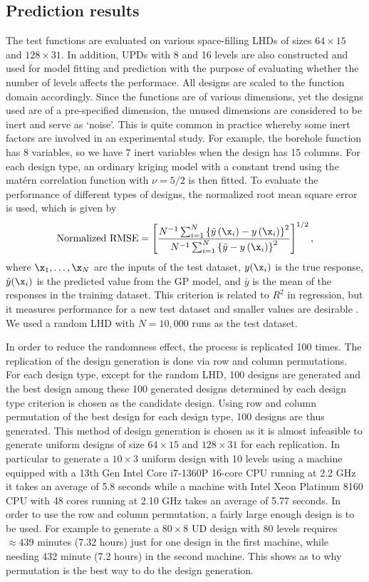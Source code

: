 \documentclass [PhD] {package/uclathes}
\begin{document}
\clearpage
\subsection{Prediction results}

The test functions are evaluated on various space-filling LHDs of sizes $64\times 15$ and $128\times 31$. In addition, UPDs with 8 and 16 levels are also constructed and used for model fitting and prediction with the purpose of evaluating whether the number of levels affects the performace. All designs are scaled to the function domain accordingly.
 Since the functions are of various dimensions, yet the designs used are of a pre-specified dimension, the unused dimensions are considered to be inert and serve as `noise'. This is quite common in practice whereby some inert factors are involved in an experimental study. For example, the borehole function has 8 variables, so we have 7 inert variables when the design has 15 columns. For each design type, an ordinary kriging model with a constant trend using the mat\'ern correlation function with $\nu = 5/2$ is then fitted. To evaluate the performance of different types of designs, the normalized root mean square error is used, which is given by
$$
\text {Normalized RMSE}=\left[\frac{N^{-1} \sum_{i=1}^N\left\{\hat{y}\left(\x_i\right)-y\left(\x_i\right)\right\}^2}{N^{-1} \sum_{i=1}^N\left\{\bar{y}-y\left(\x_i\right)\right\}^2}\right]^{1 / 2},
$$
where $\x_1, \ldots, \x_N$ are the inputs of the test dataset, $y(\x_i)$ is the true response, $\hat{y}(\x_i)$ is the predicted value from the GP model, and $\bar{y}$ is the mean of the responses in the training dataset. This criterion is related to $R^2$ in regression, but it measures performance for a new test dataset and smaller values are desirable \parencite{chen2016analysis}. We used a random LHD with $N=10,000$ runs as the test dataset.

In order to reduce the randomness effect, the process is replicated 100 times. The replication  of the design generation is done via row and column permutations.  For each design type, except for the random LHD, 100 designs are generated and the best design among these 100 generated designs determined by each design type criterion is chosen as the candidate design. Using row and column permutation of the best design for each design type, 100  designs are thus generated. This method of design generation is chosen as it is almost infeasible to generate uniform designs of size $64 \times 15$ and $128\times 31$ for each replication. In particular to generate a $10\times 3$ uniform design with 10 levels using a machine equipped with a 13th Gen Intel Core\texttrademark{} i7-1360P 16-core CPU running at 2.2 GHz it takes an average of 5.8 seconds while a machine with Intel\textregistered{} Xeon\textregistered{} Platinum 8160 CPU with 48 cores running at 2.10 GHz takes an average of 5.77 seconds. In order to use the row and column permutation, a fairly large enough design is to be used. For example to generate a $80\times 8$ UD design with 80 levels requires $\approx 439$ minutes (7.32 hours) just for one design in the first machine, while needing 432 minute (7.2 hours) in the second machine. This shows as to why permutation is the best way to do the design generation.
\end{document}
